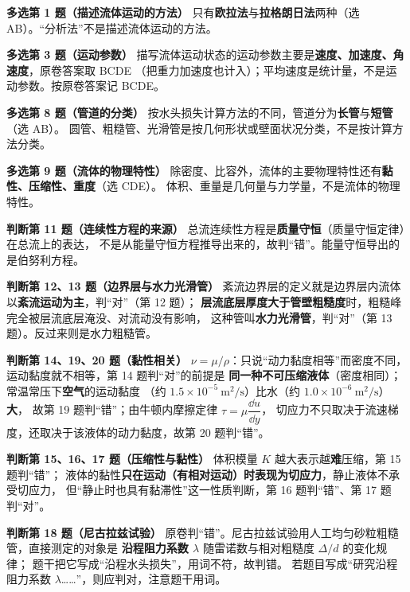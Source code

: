 \noindent\textbf{多选第 1 题（描述流体运动的方法）}\quad
只有\textbf{欧拉法}与\textbf{拉格朗日法}两种（选 AB）。“分析法”不是描述流体运动的方法。

\noindent\textbf{多选第 3 题（运动参数）}\quad
描写流体运动状态的运动参数主要是\textbf{速度、加速度、角速度}，原卷答案取 BCDE
（把重力加速度也计入）；平均速度是统计量，不是运动参数。按原卷答案记 BCDE。

\noindent\textbf{多选第 8 题（管道的分类）}\quad
按水头损失计算方法的不同，管道分为\textbf{长管}与\textbf{短管}（选 AB）。
圆管、粗糙管、光滑管是按几何形状或壁面状况分类，不是按计算方法分类。

\noindent\textbf{多选第 9 题（流体的物理特性）}\quad
除密度、比容外，流体的主要物理特性还有\textbf{黏性、压缩性、重度}（选 CDE）。
体积、重量是几何量与力学量，不是流体的物理特性。

\noindent\textbf{判断第 11 题（连续性方程的来源）}\quad
总流连续性方程是\textbf{质量守恒}（质量守恒定律）在总流上的表达，
不是从能量守恒方程推导出来的，故判“错”。能量守恒导出的是伯努利方程。

\noindent\textbf{判断第 12、13 题（边界层与水力光滑管）}\quad
紊流边界层的定义就是边界层内流体以\textbf{紊流运动为主}，判“对”（第 12 题）；
\textbf{层流底层厚度大于管壁粗糙度}时，粗糙峰完全被层流底层淹没、对流动没有影响，
这种管叫\textbf{水力光滑管}，判“对”（第 13 题）。反过来则是水力粗糙管。

\noindent\textbf{判断第 14、19、20 题（黏性相关）}\quad
$\nu=\mu/\rho$：只说“动力黏度相等”而密度不同，运动黏度就不相等，第 14 题判“对”的前提是
\textbf{同一种不可压缩液体}（密度相同）；常温常压下\textbf{空气}的运动黏度
（约 $1.5\times10^{-5}\ \mathrm{m^2/s}$）比水（约 $1.0\times10^{-6}\ \mathrm{m^2/s}$）\textbf{大}，
故第 19 题判“错”；由牛顿内摩擦定律 $\tau=\mu\dfrac{\dd u}{\dd y}$，
切应力不只取决于流速梯度，还取决于该液体的动力黏度，故第 20 题判“错”。

\noindent\textbf{判断第 15、16、17 题（压缩性与黏性）}\quad
体积模量 $K$ 越大表示越\textbf{难}压缩，第 15 题判“错”；
液体的黏性\textbf{只在运动（有相对运动）时表现为切应力}，静止液体不承受切应力，
但“静止时也具有黏滞性”这一性质判断，第 16 题判“错”、第 17 题判“对”。

\noindent\textbf{判断第 18 题（尼古拉兹试验）}\quad
原卷判“错”。尼古拉兹试验用人工均匀砂粒粗糙管，直接测定的对象是
\textbf{沿程阻力系数 $\lambda$} 随雷诺数与相对粗糙度 $\Delta/d$ 的变化规律；
题干把它写成“沿程水头损失”，用词不符，故判错。
若题目写成“研究沿程阻力系数 $\lambda$……”，则应判对，注意题干用词。

